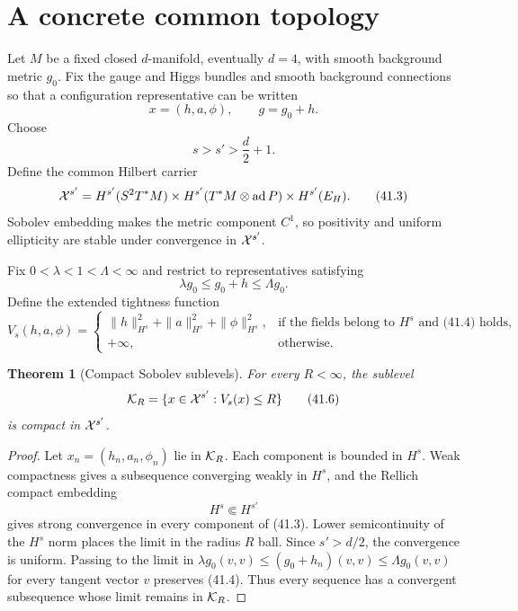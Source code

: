 \documentclass[11pt]{article}
\newtheorem{theorem}{Theorem}[section]
\theoremstyle{remark}
\begin{document}
\section{A concrete common topology}

Let \(M\) be a fixed closed \(d\)-manifold, eventually \(d=4\),
with smooth background metric \(g_0\).  Fix the gauge and Higgs
bundles and smooth background connections so that a configuration
representative can be written
\[
 x=(h,a,\phi),\qquad g=g_0+h.                            \tag{41.1}
\]
Choose
\[
 s>s'>\frac d2+1.                                       \tag{41.2}
\]
Define the common Hilbert carrier
\[
 {\cal X}^{s'}=
 H^{s'}(S^2T^*M)\times
 H^{s'}(T^*M\otimes\operatorname{ad}P)\times
 H^{s'}(E_H).                                            \tag{41.3}
\]
Sobolev embedding makes the metric component \(C^1\), so positivity
and uniform ellipticity are stable under convergence in
\({\cal X}^{s'}\).

Fix \(0<\lambda<1<\Lambda<\infty\) and restrict to representatives
satisfying
\[
 \lambda g_0\leq g_0+h\leq\Lambda g_0.                  \tag{41.4}
\]
Define the extended tightness function
\[
 V_s(h,a,\phi)=
 \begin{cases}
 \|h\|_{H^s}^2+\|a\|_{H^s}^2+\|\phi\|_{H^s}^2,
   &\text{if the fields belong to \(H^s\) and (41.4) holds},\\
 +\infty,&\text{otherwise}.
 \end{cases}                                             \tag{41.5}
\]

\begin{theorem}[Compact Sobolev sublevels]
\label{thm:v15v41-compact-sublevels}
For every \(R<\infty\), the sublevel
\[
 {\cal K}_R=\{x\in{\cal X}^{s'}:V_s(x)\leq R\}           \tag{41.6}
\]
is compact in \({\cal X}^{s'}\).
\end{theorem}

\begin{proof}
Let \(x_n=(h_n,a_n,\phi_n)\) lie in \({\cal K}_R\).  Each component
is bounded in \(H^s\).  Weak compactness gives a subsequence
converging weakly in \(H^s\), and the Rellich compact embedding
\[
 H^s\Subset H^{s'}                                      \tag{41.7}
\]
gives strong convergence in every component of (41.3).  Lower
semicontinuity of the \(H^s\) norm places the limit in the radius
\(R\) ball.  Since \(s'>d/2\), the convergence is uniform.  Passing
to the limit in
\(\lambda g_0(v,v)\leq(g_0+h_n)(v,v)\leq
\Lambda g_0(v,v)\) for every tangent vector \(v\) preserves
(41.4).  Thus every sequence has a convergent subsequence whose
limit remains in \({\cal K}_R\).
\end{proof}
\end{document}
